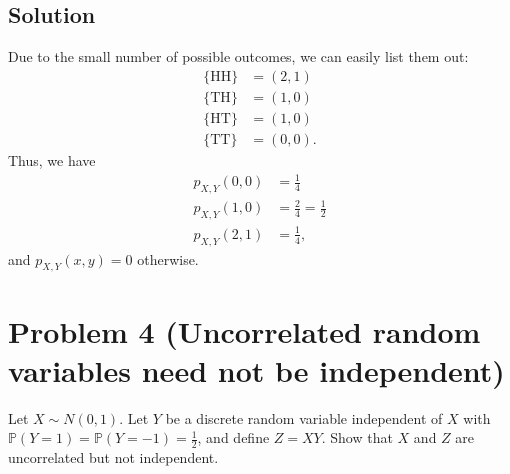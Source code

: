 \documentclass[10pt,a4paper]{article}
\theoremstyle{theorem}
\theoremstyle{definition}
\newcommand{\Prob}{\mathbb{P}}
\begin{document}
\subsection*{Solution} Due to the small number of possible outcomes, we can easily list them out:
\begin{align*}
\{ \text{HH} \} &= (2, 1)\\
\{ \text{TH} \} &= (1, 0)\\
\{ \text{HT} \} &= (1, 0)\\
\{ \text{TT} \} &= (0, 0).
\end{align*}
Thus, we have 
\begin{align*}
p_{X, Y} (0, 0) &= \frac{1}{4}\\
p_{X, Y} (1, 0) &= \frac{2}{4} = \frac{1}{2}\\
p_{X, Y} (2, 1) &= \frac{1}{4},
\end{align*}
and $p_{X, Y} (x, y) = 0$ otherwise.

\section*{Problem 4 (Uncorrelated random variables need not be independent)} Let $X \sim N(0, 1)$. Let $Y$ be a discrete random variable independent of $X$ with $\Prob(Y = 1) = \Prob(Y = -1) = \frac{1}{2}$, and define $Z = XY$. Show that $X$ and $Z$ are uncorrelated but not independent.
\end{document}
